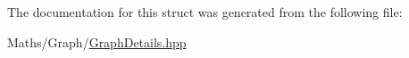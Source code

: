 The documentation for this struct was generated from the following file\+:\begin{DoxyCompactItemize}
\item 
Maths/\+Graph/\mbox{\hyperlink{_graph_details_8hpp}{Graph\+Details.\+hpp}}\end{DoxyCompactItemize}
